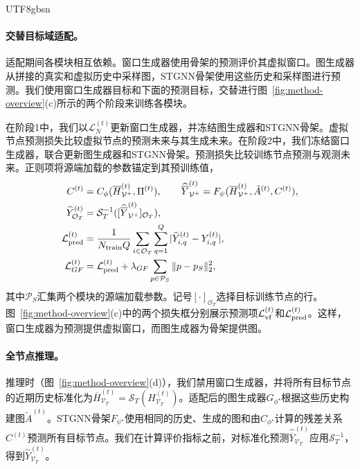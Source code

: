\documentclass[runningheads,a4paper]{llncs}
\begin{document}
\begin{CJK*}{UTF8}{gbsn}
\paragraph{交替目标域适配。}
适配期间各模块相互依赖。窗口生成器使用骨架的预测评价其虚拟窗口。图生成器从拼接的真实和虚拟历史中采样图，STGNN骨架使用这些历史和采样图进行预测。我们使用窗口生成器目标和下面的预测目标，交替进行图~\ref{fig:method-overview}(c)所示的两个阶段来训练各模块。

在阶段1中，我们以$\mathcal L_N^{(t)}$更新窗口生成器，并冻结图生成器和STGNN骨架。虚拟节点预测损失比较虚拟节点的预测未来与其生成未来。在阶段2中，我们冻结窗口生成器，联合更新图生成器和STGNN骨架。预测损失比较训练节点预测与观测未来。正则项将源端加载的参数锚定到其预训练值，
\begin{equation}
\begin{aligned}
  C^{(t)}&=C_\phi(\overline H_{\mathcal V^{+}}^{(t)},\Pi^{(t)}),\qquad
  \widehat{\overline Y}_{\mathcal V^{+}}^{(t)}=F_\psi(\overline H_{\mathcal V^{+}}^{(t)},\tilde A^{(t)},C^{(t)}),\\
  \widehat Y_{\mathcal O_{T}}^{(t)}&=\mathcal S_T^{-1}([\widehat{\overline Y}_{\mathcal V^{+}}^{(t)}]_{\mathcal O_{T}}),\\
  \mathcal L_{\rm pred}^{(t)}&=\frac{1}{\text{$N_{\mathrm{train}}$}Q}\sum_{i\in\mathcal O_{T}}\sum_{q=1}^{Q}
      |\widehat Y_{i,q}^{(t)}-Y_{i,q}^{(t)}|,\\
  \mathcal L_{GF}^{(t)}&=\mathcal L_{\rm pred}^{(t)}
      +\lambda_{GF}\sum_{p\in\mathcal P_S}\|p-p_S\|_2^2,
\end{aligned}
  \label{eq:target-objectives}
\end{equation}
其中$\mathcal P_S$汇集两个模块的源端加载参数。记号$[\cdot]_{\mathcal O_T}$选择目标训练节点的行。图~\ref{fig:method-overview}(c)中的两个损失框分别展示预测项$\mathcal L_{\rm vf}^{(t)}$和$\mathcal L_{\rm pred}^{(t)}$。这样，窗口生成器为预测提供虚拟窗口，而图生成器为骨架提供图。

\paragraph{全节点推理。}
推理时（图~\ref{fig:method-overview}(d)），我们禁用窗口生成器，并将所有目标节点的近期历史标准化为$\overline H_{\mathcal V_T}^{(t)}=\mathcal S_T(H_{\mathcal V_T}^{(t)})$。适配后的图生成器$G_{\phi^\star}$根据这些历史构建图$\tilde A^{(t)}$。STGNN骨架$F_{\psi^\star}$使用相同的历史、生成的图和由$C_{\phi^\star}$计算的残差关系$C^{(t)}$预测所有目标节点。我们在计算评价指标之前，对标准化预测$\widehat{\overline Y}_{\mathcal V_T}^{(t)}$应用$\mathcal S_T^{-1}$，得到$\widehat Y_{\mathcal V_T}^{(t)}$。



\end{CJK*}
\end{document}
